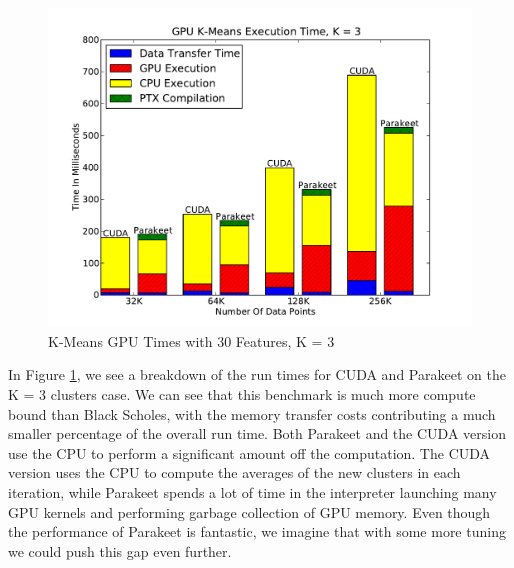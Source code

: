 \documentclass[10pt,twocolumn]{article}
\begin{document}
\begin{figure}
\includegraphics[scale=0.45]{KMGPU.pdf}
\caption{K-Means GPU Times with 30 Features, K = 3}
\label{KMGPU}
\end{figure}

In Figure \ref{KMGPU}, we see a breakdown of the run times for CUDA and Parakeet on the K = 3 clusters case.  We can see that this benchmark is much more compute bound than Black Scholes, with the memory transfer costs contributing a much smaller percentage of the overall run time.  Both Parakeet and the CUDA version use the CPU to perform a significant amount off the computation.  The CUDA version uses the CPU to compute the averages of the new clusters in each iteration, while Parakeet spends a lot of time in the interpreter launching many GPU kernels and performing garbage collection of GPU memory.  Even though the performance of Parakeet is fantastic, we imagine that with some more tuning we could push this gap even further.
\end{document}
